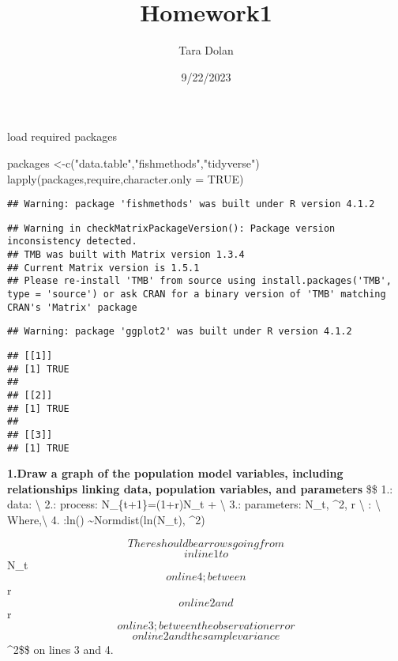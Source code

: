 \documentclass[
]{article}
\title{Homework1}
\author{Tara Dolan}
\date{9/22/2023}
\newenvironment{Shaded}{\begin{snugshade}}{\end{snugshade}}
\newcommand{\AttributeTok}[1]{\textcolor[rgb]{0.77,0.63,0.00}{#1}}
\newcommand{\ConstantTok}[1]{\textcolor[rgb]{0.00,0.00,0.00}{#1}}
\newcommand{\FunctionTok}[1]{\textcolor[rgb]{0.00,0.00,0.00}{#1}}
\newcommand{\NormalTok}[1]{#1}
\newcommand{\OtherTok}[1]{\textcolor[rgb]{0.56,0.35,0.01}{#1}}
\newcommand{\StringTok}[1]{\textcolor[rgb]{0.31,0.60,0.02}{#1}}
\begin{document}
\maketitle

load required packages

\begin{Shaded}
\begin{Highlighting}[]
\NormalTok{packages }\OtherTok{\textless{}{-}}\FunctionTok{c}\NormalTok{(}\StringTok{"data.table"}\NormalTok{,}\StringTok{"fishmethods"}\NormalTok{,}\StringTok{"tidyverse"}\NormalTok{)}
\FunctionTok{lapply}\NormalTok{(packages,require,}\AttributeTok{character.only =} \ConstantTok{TRUE}\NormalTok{)}
\end{Highlighting}
\end{Shaded}

\begin{verbatim}
## Warning: package 'fishmethods' was built under R version 4.1.2
\end{verbatim}

\begin{verbatim}
## Warning in checkMatrixPackageVersion(): Package version inconsistency detected.
## TMB was built with Matrix version 1.3.4
## Current Matrix version is 1.5.1
## Please re-install 'TMB' from source using install.packages('TMB', type = 'source') or ask CRAN for a binary version of 'TMB' matching CRAN's 'Matrix' package
\end{verbatim}

\begin{verbatim}
## Warning: package 'ggplot2' was built under R version 4.1.2
\end{verbatim}

\begin{verbatim}
## [[1]]
## [1] TRUE
## 
## [[2]]
## [1] TRUE
## 
## [[3]]
## [1] TRUE
\end{verbatim}

\textbf{1.Draw a graph of the population model variables, including
relationships linking data, population variables, and parameters} \$\$
1.: data:  \textbackslash{} 2.: process: N\_\{t+1\}=(1+r)N\_t +
\varepsilon \textbackslash{} 3.: parameters: N\_t, \sigma\^{}2, r
\textbackslash{} : \textbackslash{} Where,\textbackslash{} 4.
:ln() \sim Normdist(ln(N\_t), \sigma\^{}2)

\[
There should be arrows going from \]\[ in line 1 to  \]N\_t\[ on line 4; between \]r\[ on line 2 and \]r\[ on line 3; between the observation error \]\varepsilon\[ on line 2 and the sample variance \]\sigma\^{}2\$\$
on lines 3 and 4.
\end{document}
